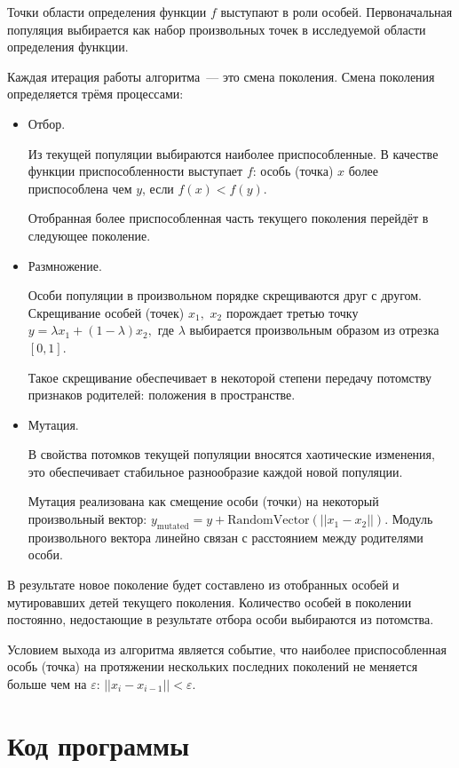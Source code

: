 \documentclass[10pt,a4paper,titlepage]{article}
\begin{document}
Точки области определения функции $f$ выступают в роли особей. 
Первоначальная популяция выбирается как набор произвольных точек в исследуемой области определения функции.

Каждая итерация работы алгоритма~--- это смена поколения. 
Смена поколения определяется трёмя процессами:
\begin{itemize}
  \item Отбор. 
  
    Из текущей популяции выбираются наиболее приспособленные.
    В качестве функции приспособленности выступает $f$: особь (точка) $x$ более приспособлена чем $y$, 
    если $f(x) < f(y)$.
  
    Отобранная более приспособленная часть текущего поколения перейдёт в следующее поколение.
  \item Размножение. 
  
    Особи популяции в произвольном порядке скрещиваются друг с другом.
    Скрещивание особей (точек) $x_1,$ $x_2$ порождает третью точку $y = \lambda x_1 + (1 - \lambda) x_2,$
    где $\lambda$ выбирается произвольным образом из отрезка $[0, 1]$.
    
    Такое скрещивание обеспечивает в некоторой степени передачу потомству признаков родителей: 
    положения в пространстве.
    
  \item Мутация.
  
    В свойства потомков текущей популяции вносятся хаотические изменения, 
    это обеспечивает стабильное разнообразие каждой новой популяции.
    
    Мутация реализована как смещение особи (точки) на некоторый произвольный вектор:
    $y_{\textrm{mutated}} = y + \textrm{RandomVector}(||x_1 - x_2||).$ 
    Модуль произвольного вектора линейно связан с расстоянием между родителями особи.
\end{itemize}

В результате новое поколение будет составлено из отобранных особей и мутировавших детей текущего поколения. 
Количество особей в поколении постоянно, недостающие в результате отбора особи выбираются из потомства.

Условием выхода из алгоритма является событие, что наиболее приспособленная особь (точка) на протяжении нескольких последних
поколений не меняется больше чем на $\varepsilon$: $||x_i - x_{i-1}|| < \varepsilon$.

\section{Код программы}
\end{document}
